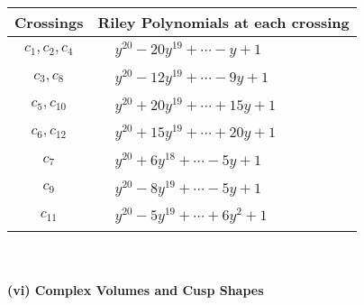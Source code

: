 \documentclass[1p]{elsarticle_modified}
\theoremstyle{definition}
\begin{document}
\begin{tabular}{m{50pt}|m{274pt}}
Crossings & \hspace{64pt}Riley Polynomials at each crossing \\
\hline $$\begin{aligned}c_{1},c_{2},c_{4}\end{aligned}$$&$\begin{aligned}
&y^{20}-20 y^{19}+\cdots- y+1
\end{aligned}$\\
\hline $$\begin{aligned}c_{3},c_{8}\end{aligned}$$&$\begin{aligned}
&y^{20}-12 y^{19}+\cdots-9 y+1
\end{aligned}$\\
\hline $$\begin{aligned}c_{5},c_{10}\end{aligned}$$&$\begin{aligned}
&y^{20}+20 y^{19}+\cdots+15 y+1
\end{aligned}$\\
\hline $$\begin{aligned}c_{6},c_{12}\end{aligned}$$&$\begin{aligned}
&y^{20}+15 y^{19}+\cdots+20 y+1
\end{aligned}$\\
\hline $$\begin{aligned}c_{7}\end{aligned}$$&$\begin{aligned}
&y^{20}+6 y^{18}+\cdots-5 y+1
\end{aligned}$\\
\hline $$\begin{aligned}c_{9}\end{aligned}$$&$\begin{aligned}
&y^{20}-8 y^{19}+\cdots-5 y+1
\end{aligned}$\\
\hline $$\begin{aligned}c_{11}\end{aligned}$$&$\begin{aligned}
&y^{20}-5 y^{19}+\cdots+6 y^2+1
\end{aligned}$\\
\hline
\end{tabular}\\~\\
\newpage\flushleft \textbf{(vi) Complex Volumes and Cusp Shapes}
\end{document}

